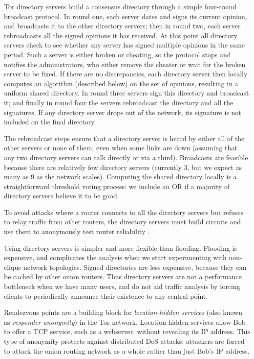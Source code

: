 \documentclass[times,10pt,twocolumn]{article}
\begin{document}
Tor directory servers build a consensus directory through a simple
four-round broadcast protocol.  In round one, each server dates and
signs its current opinion, and broadcasts it to the other directory
servers; then in round two, each server rebroadcasts all the signed
opinions it has received.  At this point all directory servers check
to see whether any server has signed multiple opinions in the same
period. Such a server is either broken or cheating, so the protocol
stops and notifies the administrators, who either remove the cheater
or wait for the broken server to be fixed.  If there are no
discrepancies, each directory server then locally computes an algorithm
(described below)
on the set of opinions, resulting in a uniform shared directory. In
round three servers sign this directory and broadcast it; and finally
in round four the servers rebroadcast the directory and all the
signatures.  If any directory server drops out of the network, its
signature is not included on the final directory.

The rebroadcast steps ensure that a directory server is heard by
either all of the other servers or none of them, even when some links
are down (assuming that any two directory servers can talk directly or
via a third). Broadcasts are feasible because there are relatively few
directory servers (currently 3, but we expect as many as 9 as the network
scales). Computing the shared directory locally is a straightforward
threshold voting process: we include an OR if a majority of directory
servers believe it to be good.

To avoid attacks where a router connects to all the directory servers
but refuses to relay traffic from other routers, the directory servers
must build circuits and use them to anonymously test router reliability
\cite{mix-acc}.

Using directory servers is simpler and more flexible than flooding.
Flooding is expensive, and complicates the analysis when we
start experimenting with non-clique network topologies. Signed
directories are less expensive, because they can be cached by other
onion routers.
Thus directory servers are not a performance
bottleneck when we have many users, and do not aid traffic analysis by
forcing clients to periodically announce their existence to any
central point.

\label{sec:rendezvous}

Rendezvous points are a building block for \emph{location-hidden
services} (also known as \emph{responder anonymity}) in the Tor
network.  Location-hidden services allow Bob to offer a TCP
service, such as a webserver, without revealing its IP address.
This type of anonymity protects against distributed DoS attacks:
attackers are forced to attack the onion routing network as a whole
rather than just Bob's IP address.
\end{document}
